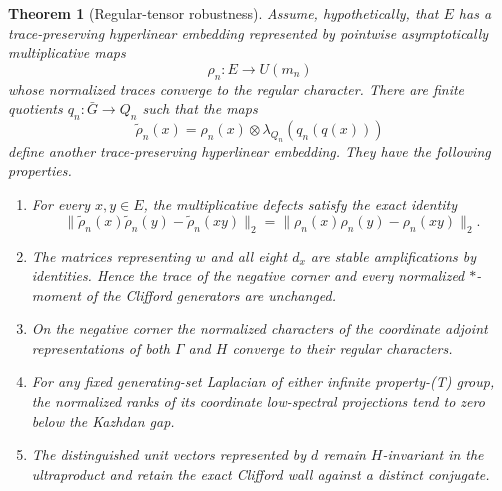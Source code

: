 \documentclass[11pt]{article}
\newtheorem{theorem}{Theorem}[section]
\theoremstyle{definition}
\theoremstyle{remark}
\begin{document}
\begin{theorem}[Regular-tensor robustness]\label{thm:dilution}
Assume, hypothetically, that $E$ has a trace-preserving hyperlinear
embedding represented by pointwise asymptotically multiplicative maps
\[
 \rho_n:E\longrightarrow U(m_n)
\]
whose normalized traces converge to the regular character.  There are finite quotients
$q_n:\bar G\to Q_n$ such that the maps
\[
 \widetilde\rho_n(x)
 =\rho_n(x)\otimes\lambda_{Q_n}(q_n(q(x)))
\]
define another trace-preserving hyperlinear embedding.  They have the
following properties.
\begin{enumerate}
\item For every $x,y\in E$, the multiplicative defects satisfy the exact
      identity
      \[
       \|\widetilde\rho_n(x)\widetilde\rho_n(y)
          -\widetilde\rho_n(xy)\|_2
       =\|\rho_n(x)\rho_n(y)-\rho_n(xy)\|_2.
      \]
\item The matrices representing $w$ and all eight $d_x$ are stable
      amplifications by identities.  Hence the trace of the negative corner
      and every normalized $*$-moment of the Clifford generators are
      unchanged.
\item On the negative corner the normalized characters of the coordinate
      adjoint representations of both $\Gamma$ and $H$ converge to their
      regular characters.
\item For any fixed generating-set Laplacian of either infinite
      property-(T) group, the normalized ranks of its coordinate
      low-spectral projections tend to zero below the Kazhdan gap.
\item The distinguished unit vectors represented by $d$ remain
      $H$-invariant in the ultraproduct and retain the exact Clifford wall
      against a distinct conjugate.
\end{enumerate}
\end{theorem}
\end{document}
